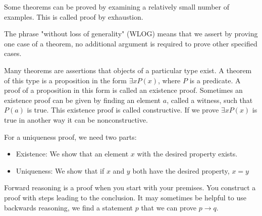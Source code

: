 \documentclass[../discrete.tex]{subfiles}
\begin{document}
Some theorems can be proved by examining a relatively small number of examples. This is called proof by exhaustion. 

The phrase "without loss of generality" (WLOG) means that we assert by proving one case of a theorem, 
no additional argument is required to prove other specified cases. 

Many theorems are assertions that objects of a particular type exist. A theorem of this type is a 
proposition in the form $\exists xP(x)$, where $P$ is a predicate. A proof of a proposition in this 
form is called an existence proof. Sometimes an existence proof can be given by finding an element $a$, 
called a witness, such that $P(a)$ is true. This existence proof is called constructive. If we prove 
$\exists xP(x)$ is true in another way it can be nonconstructive.

For a uniqueness proof, we need two parts:
\begin{itemize}
    \item Existence: We show that an element $x$ with the desired property exists.
    \item Uniqueness: We show that if $x$ and $y$ both have the desired property, $x=y$
\end{itemize}

Forward reasoning is a proof when you start with your premises. You construct a proof with steps 
leading to the conclusion. It may sometimes be helpful to use backwards reasoning, we find a 
statement $p$ that we can prove $p\rightarrow q$. 
\end{document}
